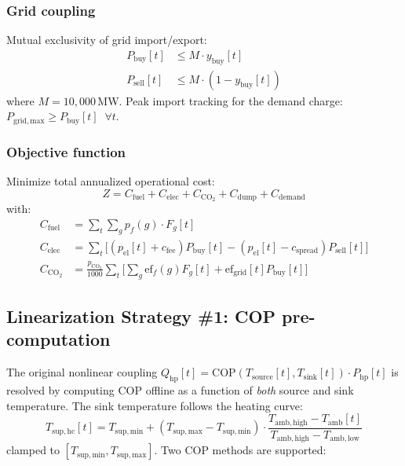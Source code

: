\documentclass[a4paper,fleqn]{cas-dc}
\begin{document}
\subsubsection{Grid coupling}

Mutual exclusivity of grid import/export:
\begin{align}
P_\mathrm{buy}[t] &\leq M \cdot y_\mathrm{buy}[t] \label{eq:grid_buy} \\
P_\mathrm{sell}[t] &\leq M \cdot (1 - y_\mathrm{buy}[t]) \label{eq:grid_sell}
\end{align}
where $M = 10{,}000$\,MW. Peak import tracking for the demand charge: $P_\mathrm{grid,max} \geq P_\mathrm{buy}[t] \;\; \forall t$.

\subsubsection{Objective function}

Minimize total annualized operational cost:
\begin{equation}
Z = C_\mathrm{fuel} + C_\mathrm{elec} + C_{\mathrm{CO}_2} + C_\mathrm{dump} + C_\mathrm{demand}
\label{eq:objective}
\end{equation}
with:
\begin{align}
C_\mathrm{fuel} &= \textstyle\sum_{t} \sum_{g} p_f(g) \cdot F_g[t] \label{eq:cost_fuel} \\
C_\mathrm{elec} &= \textstyle\sum_{t} \bigl[(p_\mathrm{el}[t] + c_\mathrm{fee}) P_\mathrm{buy}[t] - (p_\mathrm{el}[t] - c_\mathrm{spread}) P_\mathrm{sell}[t]\bigr] \label{eq:cost_elec} \\
C_{\mathrm{CO}_2} &= \textstyle\frac{p_{\mathrm{CO}_2}}{1000} \sum_{t} \bigl[\sum_{g} \mathrm{ef}_f(g) F_g[t] + \mathrm{ef}_\mathrm{grid}[t] P_\mathrm{buy}[t]\bigr] \label{eq:cost_co2}
\end{align}

\subsection{Linearization Strategy \#1: COP pre-computation}\label{sec:linearization_cop}

The original nonlinear coupling $Q_\mathrm{hp}[t] = \mathrm{COP}(T_\mathrm{source}[t], T_\mathrm{sink}[t]) \cdot P_\mathrm{hp}[t]$ is resolved by computing COP offline as a function of \emph{both} source and sink temperature. The sink temperature follows the heating curve:
\begin{equation}
T_{\mathrm{sup,hc}}[t] = T_{\mathrm{sup,min}} +
  (T_{\mathrm{sup,max}} - T_{\mathrm{sup,min}}) \cdot
  \frac{T_{\mathrm{amb,high}} - T_{\mathrm{amb}}[t]}
       {T_{\mathrm{amb,high}} - T_{\mathrm{amb,low}}}
\label{eq:heating_curve}
\end{equation}
clamped to $[T_{\mathrm{sup,min}}, T_{\mathrm{sup,max}}]$. Two COP methods are supported:
\end{document}
